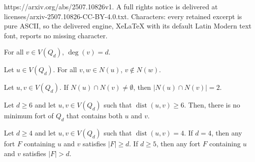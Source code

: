 \documentclass[10pt,a4paper]{amsart}
\newcommand\abs[1]{\left|#1\right|}
\newcommand\dist[2]{\operatorname{dist}\left(#1,#2\right)}
\renewcommand\deg[1]{\operatorname{deg}\left(#1\right)}
\begin{document}
https://arxiv.org/abs/2507.10826v1. A full rights notice is delivered at licenses/arxiv-2507.10826-CC-BY-4.0.txt. Characters: every retained excerpt is pure ASCII, so the delivered engine, XeLaTeX with its default Latin Modern text font, reports no missing character.
\begin{observation}\label{obs:dreg}
For all $v\in V(Q_{d})$, $\deg{v}=d$. 
\end{observation}

\begin{observation}\label{obs:neighbors}
Let $u\in V(Q_{d})$.
For all $v,w\in N(u)$, $v\notin N(w)$. 
\end{observation}

\begin{proposition}\label{prop:4cycle}
Let $u,v\in V(Q_{d})$.
If $N(u)\cap N(v)\neq\emptyset$, then $\abs{N(u)\cap N(v)}=2$.
\end{proposition}

\begin{proposition}\label{prop:max_dist6}
Let $d\geq 6$ and let $u,v\in V(Q_{d})$ such that $\dist{u}{v}\geq 6$.
Then, there is no minimum fort of $Q_{d}$ that contains both $u$ and $v$. 
\end{proposition}

\begin{proposition}\label{prop:max_dist4}
Let $d\geq 4$ and let $u,v\in V(Q_{d})$ such that $\dist{u}{v}=4$.
If $d=4$, then any fort $F$ containing $u$ and $v$ satisfies $\abs{F}\geq d$.
If $d\geq 5$, then any fort $F$ containing $u$ and $v$ satisfies $\abs{F}>d$. 
\end{proposition}
\end{document}
